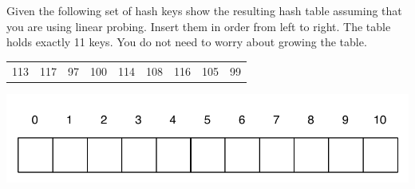 \documentclass[11pt]{exam}
\begin{document}
\begin{questions}


\newpage
\question[10] Given the following set of hash keys show the resulting hash table assuming that you are using linear probing.  Insert them in order from left to right.  The table holds exactly 11 keys.  You do not need to worry about growing the table.

\begin{table}[h!]
    \begin{center}
    \begin{tabular}{|c|c|c|c|c|c|c|c|c|}
    113 & 117 & 97 & 100 & 114 & 108 & 116 & 105 & 99 \\
     \end{tabular}
     \includegraphics{hash_table_11}
    \end{center}
    \label{htab}
\end{table}



\end{questions}
\end{document}
